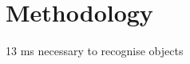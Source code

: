 \chapter{Methodology}\label{ch:methodology}
\cite{trafton2014blink} 13 ms necessary to recognise objects
